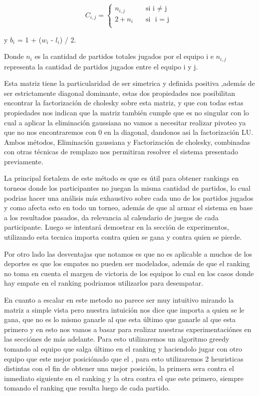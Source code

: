 \[ C_{i,j} =
    \begin{cases}
        n_{i,j}       & \quad \text{si }  \text{i $\neq$ j}\\
        2+n_i & \quad \text{si } \text{ i = j }\\
    \end{cases}

    \]
                    
y $b_i$ = 1 +  ($w_i$ - $l_i$) / 2.

Donde $n_i$ es la cantidad de partidos totales jugados por el equipo i e $n_{i,j}$ representa la cantidad de partidos jugados entre el equipo i y j.

Esta matriz tiene la particularidad de ser simetrica y definida positiva ,adem\'as de ser estrictamente diagonal dominante, estas dos propiedades nos 
posibilitan encontrar la factorizaci\'on de cholesky sobre esta matriz, y que con todas estas propiedades nos indican que la matriz tambi\'en cumple que es no singular 
con lo cual a aplicar la eliminaci\'on gaussiana no vamos a necesitar realizar pivoteo ya que no nos encontraremos con 0 en la diagonal, dandonos asi la factorizaci\'on LU.
Ambos m\'etodos, Eliminaci\'on gaussiana y Factorizaci\'on de cholesky, combinadas con otras t\'ecnicas de remplazo nos permitiran resolver el sistema presentado previamente.

La principal fortaleza de este método es que es útil para obtener rankings en torneos donde los participantes no juegan la misma cantidad de partidos, lo cual 
podrias hacer una an\'alisis m\'as exhaustivo sobre cada uno de los partidos jugados y como afecta esto en todo un torneo,
además de que al armar el sistema en base a los resultados pasados, da relevancia al calendario de juegos de cada participante. 
Luego se intentará demostrar en la sección de experimentos, utilizando esta tecnica importa contra quien se gana y contra quien se pierde.

Por otro lado las desventajas que notamos es que no es aplicable a muchos de los deportes es que los empates no pueden ser modelados, adem\'as de que el ranking no toma en cuenta
el margen de victoria de los equipos lo cual en los casos donde hay empate en el ranking podriamos utilizarlos para desempatar.

En cuanto a escalar en este metodo no parece ser muy intuitivo mirando la matriz a simple vista pero nuestra intuici\'on nos dice que importa a quien se le gana, que no es lo mismo ganarle al que esta \'ultimo que ganarle al que esta primero
y en esto nos vamos a basar para realizar nuestras experimentaci\'ones en las secci\'ones de m\'as adelante.
Para esto utilizaremos un algoritmo greedy tomando al equipo que salga \'ultimo en el ranking y haciendolo jugar con otro equipo que este mejor posici\'onado que el , para esto utilizaremos 2 heuristicas distintas
con el fin de obtener una mejor posici\'on, la primera sera contra el inmediato siguiente en el ranking y la otra contra el que este primero, siempre tomando el ranking que resulta luego de cada partido.

